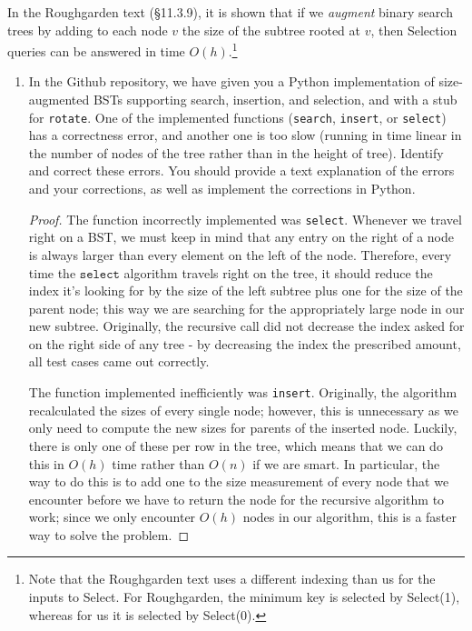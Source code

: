 \documentclass[11pt]{article}
\begin{document}
\begin{enumerate}
    In the Roughgarden text (\S11.3.9), it is shown that if we {\em augment} binary search trees by adding to each node $v$ the size of the subtree rooted at $v$, then Selection queries can be answered in time $O(h)$.\footnote{Note that the Roughgarden text uses a different indexing than us for the inputs to Select. For Roughgarden, the minimum key is selected by Select(1), whereas for us it is selected by Select(0).}
    
    \begin{enumerate}
        \item In the Github repository, we have given you a Python implementation of size-augmented BSTs supporting search, insertion, and selection, and with a stub for \texttt{rotate}. One of the implemented functions (\texttt{search}, \texttt{insert}, or \texttt{select}) has a correctness error, and another one is too slow (running in time linear in the number of nodes of the tree rather than in the height of tree). Identify and correct these errors. You should provide a text explanation of the errors and your corrections, as well as implement the corrections in Python.

\begin{proof}
The function incorrectly implemented was \texttt{select}. Whenever we travel right on a BST, we must keep in mind that any entry on the right of a node is always larger than every element on the left of the node. Therefore, every time the $\texttt{select}$ algorithm travels right on the tree, it should reduce the index it's looking for by the size of the left subtree plus one for the size of the parent node; this way we are searching for the appropriately large node in our new subtree. Originally, the recursive call did not decrease the index asked for on the right side of any tree - by decreasing the index the prescribed amount, all test cases came out correctly.

The function implemented inefficiently was \texttt{insert}. Originally, the algorithm recalculated the sizes of every single node; however, this is unnecessary as we only need to compute the new sizes for parents of the inserted node. Luckily, there is only one of these per row in the tree, which means that we can do this in $O(h)$ time rather than $O(n)$ if we are smart. In particular, the way to do this is to add one to the size measurement of every node that we encounter before we have to return the node for the recursive algorithm to work; since we only encounter $O(h)$ nodes in our algorithm, this is a faster way to solve the problem.
\end{proof}
        

\end{enumerate}
\end{enumerate}
\end{document}
